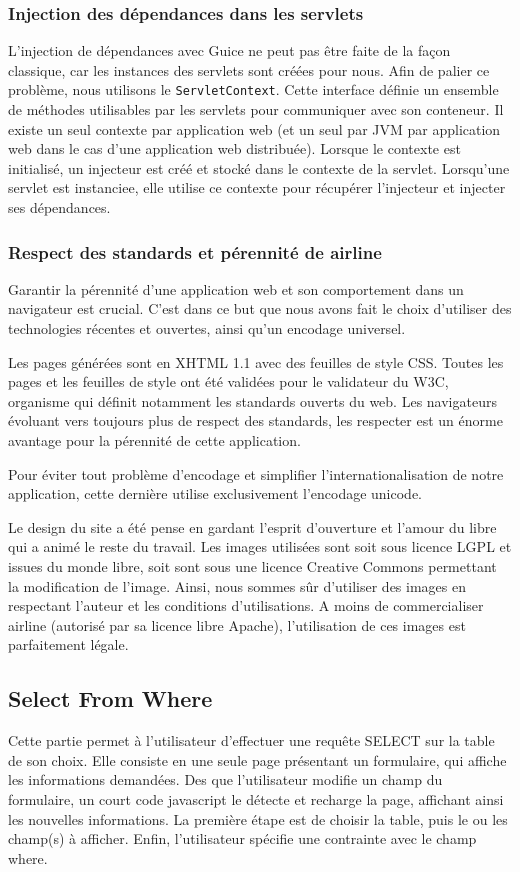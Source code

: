 \subsubsection{Injection des dépendances dans les servlets}
L'injection de dépendances avec Guice ne peut pas être faite de la façon classique, car les instances des servlets sont créées pour nous. Afin de palier ce problème, nous utilisons le \verb|ServletContext|. Cette  interface définie un ensemble de méthodes utilisables par les servlets pour communiquer avec son conteneur. Il existe un seul contexte par application web (et un seul par JVM par application web dans le cas d'une application web distribuée). Lorsque le contexte est initialisé, un injecteur est créé et stocké dans le contexte de la servlet. Lorsqu'une servlet est instanciee, elle utilise ce contexte pour récupérer l'injecteur et injecter ses dépendances.

\subsubsection{Respect des standards et pérennité de airline}
Garantir la pérennité d'une application web et son comportement dans un navigateur est crucial. C'est dans ce but que nous avons fait le choix d'utiliser des technologies récentes et ouvertes, ainsi qu'un encodage universel.

Les pages générées sont en XHTML 1.1 avec des feuilles de style CSS. Toutes les pages et les feuilles de style ont été validées pour le validateur du W3C, organisme qui définit notamment les standards ouverts du web. Les navigateurs évoluant vers toujours plus de respect des standards, les respecter est un énorme avantage pour la pérennité de cette application.

Pour éviter tout problème d'encodage et simplifier l'internationalisation de notre application, cette dernière utilise exclusivement l'encodage unicode.

Le design du site a été pense en gardant l'esprit d'ouverture et l'amour du libre qui a animé le reste du travail. Les images utilisées sont soit sous licence LGPL et issues du monde libre, soit sont sous une licence Creative Commons permettant la modification de l'image. Ainsi, nous sommes sûr d'utiliser des images en respectant l'auteur et les conditions d'utilisations. A moins de commercialiser airline (autorisé par sa licence libre Apache), l'utilisation de ces images est parfaitement légale.

\subsection{Select From Where}
Cette partie permet à l'utilisateur d'effectuer une requête SELECT sur la table de son choix. Elle consiste en une seule page présentant un formulaire, qui affiche les informations demandées. Des que l'utilisateur modifie un champ du formulaire, un court code javascript le détecte et recharge la page, affichant ainsi les nouvelles informations. La première étape est de choisir la table, puis le ou les champ(s) à afficher. Enfin, l'utilisateur spécifie une contrainte avec le champ where.

